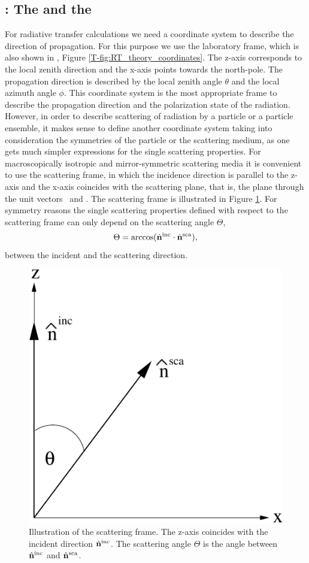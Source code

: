 \subsection[Coordinate systems]{: The
   and the  }
\label{sec:clouds:coordinate_sytems}

For radiative transfer calculations we need a coordinate system to
describe the direction of propagation. For this purpose we use the
laboratory frame, which is also shown in
\theory, Figure \ref{T-fig:RT_theory_coordinates}.  The z-axis corresponds to the
local zenith direction and the x-axis points towards the
north-pole. The propagation direction is described by the local zenith
angle $\theta$ and the local azimuth angle $\phi$.  This coordinate
system is the most appropriate frame to describe the propagation
direction and the polarization state of the radiation.  However, in
order to describe scattering of radiation by a particle or a particle
ensemble, it makes sense to define another coordinate system taking
into consideration the symmetries of the particle or the scattering
medium, as one gets much simpler expressions for the single scattering
properties.  For macroscopically isotropic and mirror-symmetric
scattering media it is convenient to use the scattering frame, in
which the incidence direction is parallel to the z-axis and the x-axis
coincides with the scattering plane, that is, the plane through the
unit vectors \ and . The
scattering frame is illustrated in
Figure \ref{fig:scattering:part_frame}. For symmetry reasons the single
scattering properties defined with respect to the scattering frame can
only depend on the scattering angle $\Theta$,
\begin{equation}
  \label{eq:scat_angle}
  \Theta=\arccos(\hat{{\bf n}}^{\mathrm{inc}} \cdot {\hat{\ensuremath{{\bf n}}}^{\mathrm{sca}}}),
\end{equation}
between the incident and the scattering direction.

\begin{figure}[htbp]
 \begin{center}
   \includegraphics*[width=0.4\hsize]{part_frame}
   \caption{Illustration of the scattering frame. The z-axis coincides with the incident direction $\hat{{\bf n}}^{\mathrm{inc}}$. The scattering angle $\Theta$ is the angle between  $\hat{{\bf n}}^{\mathrm{inc}}$ and $\hat{{\bf n}}^{\mathrm{sca}}$.}
   \label{fig:scattering:part_frame}  
 \end{center}
\end{figure}

